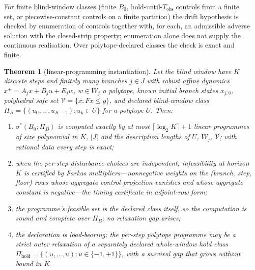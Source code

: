 \documentclass[11pt,a4paper]{article}
\theoremstyle{plain}
\newtheorem{theorem}{Theorem}[section]
\theoremstyle{definition}
\theoremstyle{remark}
\newcommand{\cV}{\mathcal{V}}
\newcommand{\Tobs}{T_{\mathrm{obs}}}
\begin{document}
For finite blind-window classes (finite $B_0$, hold-until-$\Tobs$ controls from a finite set, or piecewise-constant controls on a finite partition) the drift hypothesis is checked by enumeration of controls together with, for each, an admissible adverse solution with the closed-strip property; enumeration alone does not supply the continuous realisation. Over polytope-declared classes the check is exact and finite.

\begin{theorem}[linear-programming instantiation]\label{thm:lp}
Let the blind window have $K$ discrete steps and finitely many branches $j\in J$ with robust affine dynamics $x^+=A_jx+B_ju+E_jw$, $w\in W_j$ a polytope, known initial branch states $x_{j,0}$, polyhedral safe set $\cV=\{x:Fx\le g\}$, and declared blind-window class $\Pi_B=\{(u_0,\dots,u_{K-1}):u_k\in U\}$ for a polytope $U$. Then:
\begin{enumerate}[label=(\roman*),leftmargin=2.2em,itemsep=1pt]
\item $\sigma^*(B_0;\Pi_B)$ is computed exactly by at most $\lceil\log_2K\rceil+1$ linear programmes of size polynomial in $K$, $|J|$ and the description lengths of $U$, $W_j$, $\cV$; with rational data every step is exact;
\item when the per-step disturbance choices are independent, infeasibility at horizon $K$ is certified by Farkas multipliers---nonnegative weights on the (branch, step, floor) rows whose aggregate control projection vanishes and whose aggregate constant is negative---the timing certificate in adjoint-row form;
\item the programme's feasible set is the declared class itself, so the computation is sound and complete over $\Pi_B$: no relaxation gap arises;
\item the declaration is load-bearing: the per-step polytope programme may be a strict outer relaxation of a separately declared whole-window hold class $\Pi_{\mathrm{hold}}=\{(u,\dots,u):u\in\{-1,+1\}\}$, with a survival gap that grows without bound in $K$.
\end{enumerate}
\end{theorem}
\end{document}
